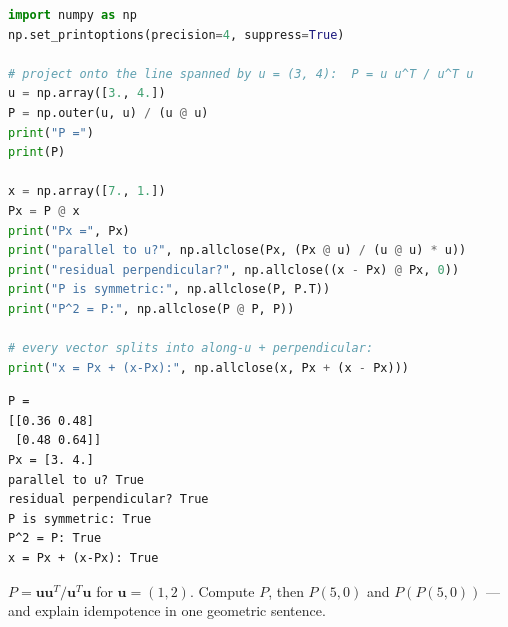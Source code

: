 \begin{lstlisting}[language=Python,caption={Projection onto a general line, built from $P=\mathbf{u}\mathbf{u}^{T}/\mathbf{u}^{T}\mathbf{u}$ alone. File: \texttt{code/ch04\_projection\_matrix.py}.},label={lst:proj}]
import numpy as np
np.set_printoptions(precision=4, suppress=True)

# project onto the line spanned by u = (3, 4):  P = u u^T / u^T u
u = np.array([3., 4.])
P = np.outer(u, u) / (u @ u)
print("P =")
print(P)

x = np.array([7., 1.])
Px = P @ x
print("Px =", Px)
print("parallel to u?", np.allclose(Px, (Px @ u) / (u @ u) * u))
print("residual perpendicular?", np.allclose((x - Px) @ Px, 0))
print("P is symmetric:", np.allclose(P, P.T))
print("P^2 = P:", np.allclose(P @ P, P))

# every vector splits into along-u + perpendicular:
print("x = Px + (x-Px):", np.allclose(x, Px + (x - Px)))
\end{lstlisting}

\begin{lstlisting}[caption={Output of listing~\ref{lst:proj}. The projection of $(7,1)$ onto the line through $(3,4)$ lands exactly at $(3,4)$ — the nearest point on the line. Symmetric and idempotent are not coincidences; Chapter 7 shows they characterize orthogonal projections.}]
P =
[[0.36 0.48]
 [0.48 0.64]]
Px = [3. 4.]
parallel to u? True
residual perpendicular? True
P is symmetric: True
P^2 = P: True
x = Px + (x-Px): True
\end{lstlisting}

\begin{exercise}[medium]
$P=\mathbf{u}\mathbf{u}^{T}/\mathbf{u}^{T}\mathbf{u}$ for $\mathbf{u}=(1,2)$. Compute $P$, then $P(5,0)$ and $P(P(5,0))$ — and explain idempotence in one geometric sentence.
\end{exercise}

